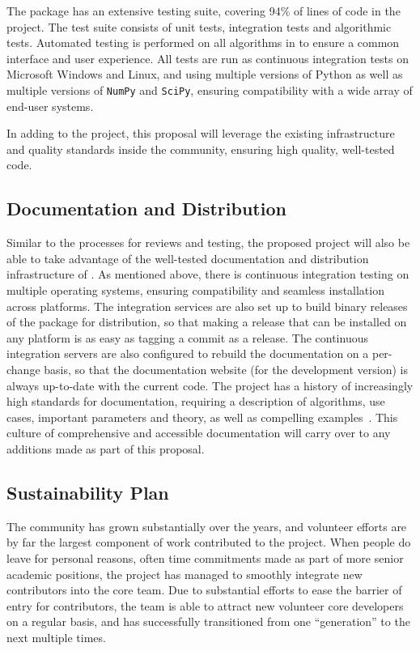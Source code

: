 The \sklearn{} package has an extensive testing suite, covering 94\% of lines of code in the project.
The test suite consists of unit tests, integration tests and algorithmic tests.
Automated testing is performed on all algorithms in \sklearn{} to ensure a common
interface and user experience.
All tests are run as continuous integration tests on Microsoft Windows and Linux, and using
multiple versions of Python as well as multiple versions of \texttt{NumPy} and \texttt{SciPy}, ensuring
compatibility with a wide array of end-user systems.

In adding to the \sklearn{} project, this proposal will leverage the existing infrastructure
and quality standards inside the \sklearn{} community, ensuring high quality, well-tested code.

\subsection{Documentation and Distribution}
Similar to the processes for reviews and testing, the proposed project will
also be able to take advantage of the well-tested documentation and distribution
infrastructure of \sklearn{}.
As mentioned above, there is continuous integration testing on multiple operating systems,
ensuring compatibility and seamless installation across platforms.
The integration services are also set up to build binary releases of the \sklearn{} package
for distribution, so that making a release that can be installed on any platform is as
easy as tagging a commit as a release.
The continuous integration servers are also configured to rebuild the documentation on a per-change
basis, so that the documentation website (for the development version) is always up-to-date
with the current code.
The \sklearn{} project has a history of increasingly high standards for documentation,
requiring a description of algorithms, use cases, important parameters and theory,
as well as compelling examples~\autocite{lovesklearn, benlorica}. This culture of comprehensive and accessible documentation
will carry over to any additions made as part of this proposal.

\subsection{Sustainability Plan}
The \sklearn{} community has grown substantially over the years, and volunteer efforts
are by far the largest component of work contributed to the project.
When people do leave for personal reasons, often time commitments made as part
of more senior academic positions, the project has managed to smoothly integrate new
contributors into the core team. Due to substantial efforts to ease the barrier
of entry for contributors, the \sklearn{} team is able to attract new volunteer
core developers on a regular basis, and has successfully transitioned from one
``generation'' to the next multiple times. 

